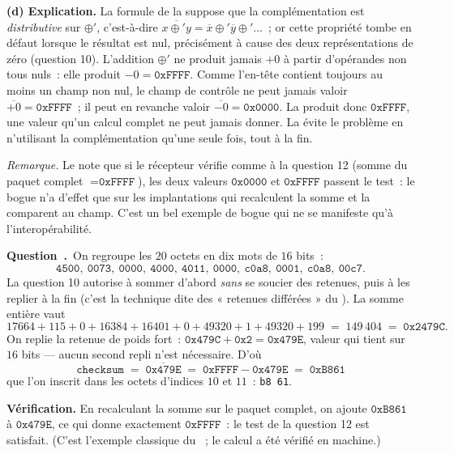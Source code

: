 \documentclass[11pt,a4paper]{article}
\renewcommand{\Q}{\medskip\par\stepcounter{qcnt}\noindent\textbf{\color{cnc}Question~\theqcnt.}~}
\begin{document}
\textbf{(d) Explication.} La formule de la  suppose que la complémentation est
\emph{distributive} sur $\oplus'$, c'est-à-dire $\overline{x\oplus' y}=\overline{x}\oplus'
\overline{y}\oplus'\dots$~; or cette propriété tombe en défaut lorsque le résultat est nul,
précisément à cause des deux représentations de zéro (question 10). L'addition $\oplus'$ ne
produit jamais $+0$ à partir d'opérandes non tous nuls~: elle produit $-0=\texttt{0xFFFF}$.
Comme l'en-tête contient toujours au moins un champ non nul, le champ de contrôle ne peut
jamais valoir $\overline{+0}=\texttt{0xFFFF}$~; il peut en revanche valoir
$\overline{-0}=\texttt{0x0000}$. La  produit donc $\texttt{0xFFFF}$, une valeur
qu'un calcul complet ne peut jamais donner. La  évite le problème en n'utilisant la
complémentation qu'une seule fois, tout à la fin.

\emph{Remarque.} Le  note que si le récepteur vérifie comme à la question 12 (somme
du paquet complet $=\texttt{0xFFFF}$), les deux valeurs $\texttt{0x0000}$ et
$\texttt{0xFFFF}$ passent le test~: le bogue n'a d'effet que sur les implantations qui
recalculent la somme et la comparent au champ. C'est un bel exemple de bogue qui ne se
manifeste qu'à l'interopérabilité.

\Q On regroupe les $20$ octets en dix mots de $16$ bits~:
\[ \texttt{4500},\ \texttt{0073},\ \texttt{0000},\ \texttt{4000},\ \texttt{4011},\
   \texttt{0000},\ \texttt{c0a8},\ \texttt{0001},\ \texttt{c0a8},\ \texttt{00c7}. \]
La question 10 autorise à sommer d'abord \emph{sans} se soucier des retenues, puis à les
replier à la fin (c'est la technique dite des « retenues différées » du \rfc{1071}). La somme
entière vaut
\[ 17664+115+0+16384+16401+0+49320+1+49320+199 \;=\; 149\,404 \;=\; \texttt{0x2479C}. \]
On replie la retenue de poids fort~: $\texttt{0x479C}+\texttt{0x2}=\texttt{0x479E}$, valeur
qui tient sur $16$ bits — aucun second repli n'est nécessaire. D'où
\[ \boxed{\texttt{checksum} \;=\; \overline{\texttt{0x479E}} \;=\; \texttt{0xFFFF}-
\texttt{0x479E} \;=\; \texttt{0xB861}} \]
que l'on inscrit dans les octets d'indices $10$ et $11$~: \texttt{b8 61}.

\textbf{Vérification.} En recalculant la somme sur le paquet complet, on ajoute
$\texttt{0xB861}$ à $\texttt{0x479E}$, ce qui donne exactement $\texttt{0xFFFF}$~: le test de
la question 12 est satisfait. (C'est l'exemple classique du \rfc{1071}~; le calcul a été
vérifié en machine.)

\end{document}
